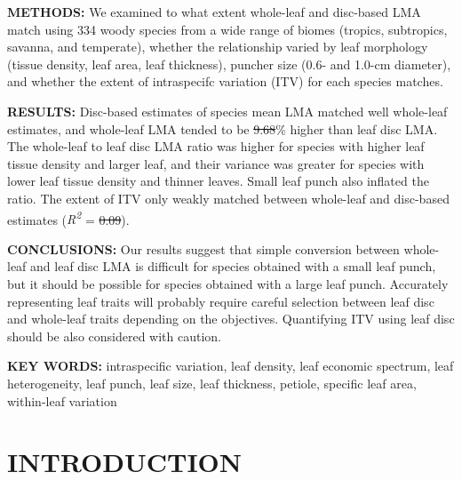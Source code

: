 \documentclass[
  12pt,
  a4paper,
,tablecaptionabove
]{scrartcl}
\providecommand{\DIFaddtex}[1]{{\protect\color{blue}\uwave{#1}}} %
\providecommand{\DIFdeltex}[1]{{\protect\color{red}\sout{#1}}}                      %
\providecommand{\DIFaddbegin}{} %
\providecommand{\DIFaddend}{} %
\providecommand{\DIFdelbegin}{} %
\providecommand{\DIFdelend}{} %
\providecommand{\DIFadd}[1]{\texorpdfstring{\DIFaddtex{#1}}{#1}} %
\providecommand{\DIFdel}[1]{\texorpdfstring{\DIFdeltex{#1}}{}} %
\begin{document}
\textbf{METHODS:}
We examined to what extent whole-leaf and disc-based LMA match using 334 woody species from a wide range of biomes (tropics, subtropics, savanna, and temperate),
whether the relationship varied by leaf morphology (tissue density, leaf area, leaf thickness), puncher size (0.6- and 1.0-cm diameter), and
whether the extent of intraspecifc variation (ITV) for each species matches.

\textbf{RESULTS:}
Disc-based estimates of species mean LMA matched well whole-leaf estimates, and whole-leaf LMA tended to be \DIFdelbegin \DIFdel{9.68}\DIFdelend \DIFaddbegin \DIFadd{9.69}\DIFaddend \% higher than leaf disc LMA.
The whole-leaf to leaf disc LMA ratio was higher for species with higher leaf tissue density and larger leaf, and their variance was greater for species with lower leaf tissue density and thinner leaves.
Small leaf punch also inflated the ratio.
The extent of ITV only weakly matched between whole-leaf and disc-based estimates (\emph{R\textsuperscript{2}} = \DIFdelbegin \DIFdel{0.09}\DIFdelend \DIFaddbegin \DIFadd{0.08}\DIFaddend ).

\textbf{CONCLUSIONS:}
Our results suggest that simple conversion between whole-leaf and leaf disc LMA is difficult for species obtained with a small leaf punch, but it should be possible for species obtained with a large leaf punch.
Accurately representing leaf traits will probably require careful selection between leaf disc and whole-leaf traits depending on the objectives.
Quantifying ITV using leaf disc should be also considered with caution.

\textbf{KEY WORDS:}
intraspecific variation,
leaf density,
leaf economic spectrum,
leaf heterogeneity,
leaf punch,
leaf size,
leaf thickness,
petiole,
specific leaf area,
within-leaf variation

\hypertarget{introduction}{%
\section{INTRODUCTION}\label{introduction}}
\end{document}
